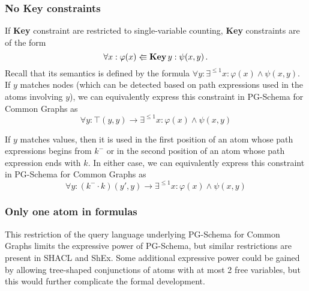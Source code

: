 \subsubsection{No \textbf{Key} constraints}
If \textbf{Key} constraint are restricted to single-variable counting, \textbf{Key} constraints are of the form \[\forall x : \varphi(x) \Lleftarrow \textsf{\bf Key} \, y : \psi(x, y)\,.\] 
Recall that its semantics is defined by the formula $\forall y : \exists^{\leq 1} x : \varphi(x) \land \psi(x, y)$. If $y$ matches nodes (which can be detected based on path expressions used in the atoms involving $y$), we can equivalently express this constraint in PG-Schema for Common Graphs as
\[
\forall y : \top(y, y) \to \exists^{\leq 1} x: \varphi(x)\land\psi(x,y)
\]

If $y$ matches values, then it is used in the first position of an atom whose path expressions begins from $k^{-}$ or in the second position of an atom whose path expression ends with $k$. In either case, we can equivalently express this constraint in PG-Schema for Common Graphs as
\[
\forall y : (k^{-}\!\cdot k) (y', y) \to \exists^{\leq 1} x: \varphi(x)\land\psi(x,y)
\]


\subsubsection{Only one atom in formulas}

This restriction of the query language underlying PG-Schema for Common Graphs limits the expressive power of PG-Schema, but similar restrictions are present in SHACL and ShEx. Some additional expressive power could be gained by allowing tree-shaped conjunctions of atoms with at most 2 free  variables, but this would further complicate the formal development.









